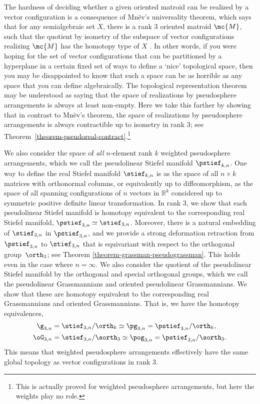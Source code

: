 The hardness of deciding whether a given oriented matroid can be realized by a vector configuration is a consequence of Mnëv's universality theorem, which says that for any semialgebraic set $X$, there is a rank $3$ oriented matroid $\mc{M}$, such that the quotient by isometry of the subspace of vector configurations realizing $\mc{M}$ has the homotopy type of $X$ \cite{mnev1988universality}.
In other words, if you were hoping for the set of vector configurations that can be partitioned by a hyperplane in a certain fixed set of ways to define a `nice' topological space, then you may be disappointed to know that such a space can be as horrible as any space that you can define algebraically.
The topological representation theorem may be understood as saying that the space of realizations by pseudosphere arrangements is always at least non-empty.
Here we take this farther by showing that in contrast to Mnëv's theorem, the space of realizations by pseudosphere arrangements is always contractible up to isometry in rank 3; see Theorem~\ref{theorem-pseudoreal-contract}.\footnote{This is actually proved for weighted pseudosphere arrangements, but here the weights play no role.}

We also consider the space of \emph{all} $n$-element rank $k$ weighted pseudosphere arrangements, which we call the pseudolinear Stiefel manifold $\pstief_{k,n}$.
One way to define the real Stiefel manifold $\stief_{k,n}$ is as the space of all $n \times k$ matrices with orthonormal columns, or equivalently up to diffeomorphism, as the space of all spanning configurations of $n$ vectors in $\mathbb{R}^k$ considered up to symmetric positive definite linear transformation.
In rank 3, we show that each pseudolinear Stiefel manifold is homotopy equivalent to the corresponding real Stiefel manifold, $\pstief_{3,n} \simeq \stief_{3,n}$.
Moreover, there is a natural embedding of $\stief_{3,n}$ in $\pstief_{3,n}$, and we provide a strong deformation retraction from $\pstief_{3,n}$ to $\stief_{3,n}$ that is equivariant with respect to the orthogonal group~$\orth_3$; see Theorem \ref{theorem-grassman-pseudograssman}.
This holds even in the case where $n = \infty$.
We also consider the quotient of the pseudolinear Stiefel manifold by the orthogonal and special orthogonal groups, which we call the pseudolinear Grassmannians and oriented pseudolinear Grassmannians. We show that these are homotopy equivalent to the corresponding real Grassmannians and oriented Grassmannians.
That is, we have the homotopy equivalences,
\begin{align*}
\g_{3,n} &= \stief_{3,n} / \orth_k \simeq \pg_{3,n} = \pstief_{3,n} / \orth_k, \\
\oG_{3,n} &= \stief_{3,n} / \sorth_3 \simeq \pog_{3,n} = \pstief_{3,n} / \sorth_3.
\end{align*}
This means that weighted pseudosphere arrangements effectively have the same global topology as vector configurations in rank 3.

